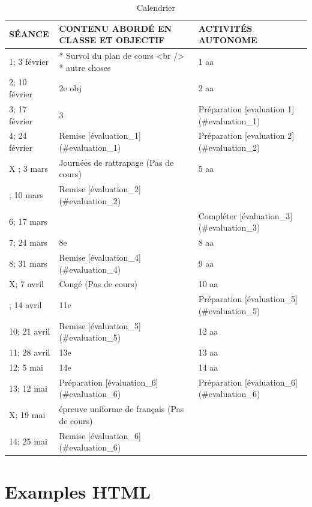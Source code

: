 \documentclass[
]{book}
\begin{document}
\begin{table}

\caption{\label{tab:calendrier}Calendrier}
\centering
\begin{tabular}[t]{lll}
\toprule
SÉANCE & CONTENU ABORDÉ EN CLASSE ET OBJECTIF & ACTIVITÉS AUTONOME\\
\midrule
1; 3 février & * Survol du plan de cours <br /> * autre choses & 1 aa\\
2; 10 février & 2e obj & 2 aa\\
3; 17 février & 3 & Préparation [evaluation 1](\#evaluation\_1)\\
4; 24 février & Remise [évaluation\_1](\#evaluation\_1) & Préparation [evaluation 2](\#evaluation\_2)\\
X ; 3 mars & Journées de rattrapage (Pas de cours) & 5 aa\\
\addlinespace
5; 10 mars & Remise [évaluation\_2](\#evaluation\_2) & \\
6; 17 mars &  & Compléter [évaluation\_3](\#evaluation\_3)\\
7; 24 mars & 8e & 8 aa\\
8; 31 mars & Remise [évaluation\_4](\#evaluation\_4) & 9 aa\\
X; 7 avril & Congé (Pas de cours) & 10 aa\\
\addlinespace
9; 14 avril & 11e & Préparation [évaluation\_5](\#evaluation\_5)\\
10; 21 avril & Remise [évaluation\_5](\#evaluation\_5) & 12 aa\\
11; 28 avril & 13e & 13 aa\\
12; 5 mai & 14e & 14 aa\\
13; 12 mai & Préparation [évaluation\_6](\#evaluation\_6) & Préparation [évaluation\_6](\#evaluation\_6)\\
\addlinespace
X; 19 mai & épreuve uniforme de français (Pas de cours) & \\
14; 25 mai & Remise [évaluation\_6](\#evaluation\_6) & \\
\bottomrule
\end{tabular}
\end{table}

\hypertarget{examples-html}{%
\chapter{Examples HTML}\label{examples-html}}

  
\end{document}
